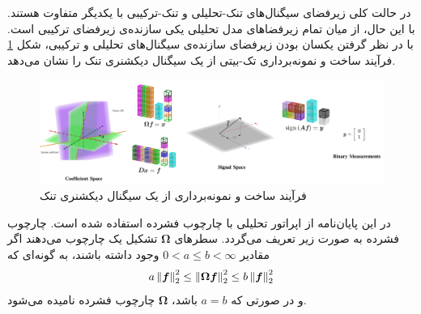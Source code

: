در حالت کلی زیرفضای سیگنال‌های تنک-تحلیلی و تنک-ترکیبی با یکدیگر متفاوت هستند. با این حال، از میان تمام زیرفضا‌های مدل 
تحلیلی یکی سازنده‌ی زیرفضای  ترکیبی است. با در نظر گرفتن یکسان بودن زیرفضای سازنده‌ی سیگنال‌های
تحلیلی و
ترکیبی، شکل 
\ref{fig12}
فرآیند ساخت و نمونه‌برداری تک-بیتی از یک سیگنال دیکشنری تنک را نشان می‌دهد.

\begin{figure}
\centering
\includegraphics[scale=0.1]{Images/ch3/fig12.png}
\caption{فرآیند ساخت و نمونه‌برداری از یک سیگنال دیکشنری تنک}
\label{fig12}
\end{figure}

در این پایان‌نامه از اپراتور تحلیلی با چارچوب فشرده 
استفاده شده است. چارچوب فشرده به صورت زیر تعریف می‌گردد.
سطر‌های 
$ \bm{\Omega} $
تشکیل یک چارچوب می‌دهند اگر مقادیر
$ 0< a\leq b < \infty $
وجود داشته باشند، به گونه‌ای که 
\begin{align}
\label{eq:eq27}
a\left\lVert\bm{f}\right\rVert^{2}_{2}\leq \left\lVert\bm{\Omega}\bm{f}\right\rVert^{2}_{2} \leq b\left\lVert\bm{f}\right\rVert^{2}_{2} 
\end{align}
و در صورتی که 
$ a=b $
باشد، 
$ \bm{\Omega} $ 
چارچوب فشرده نامیده می‌شود.


